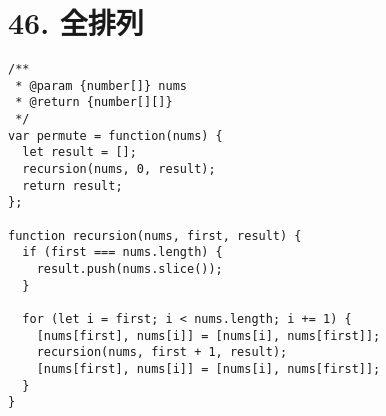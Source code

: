\newpage
\section{46. 全排列}
\label{leetcode:46}

\begin{verbatim}
/**
 * @param {number[]} nums
 * @return {number[][]}
 */
var permute = function(nums) {
  let result = [];
  recursion(nums, 0, result);
  return result;
};

function recursion(nums, first, result) {
  if (first === nums.length) {
    result.push(nums.slice());
  }

  for (let i = first; i < nums.length; i += 1) {
    [nums[first], nums[i]] = [nums[i], nums[first]];
    recursion(nums, first + 1, result);
    [nums[first], nums[i]] = [nums[i], nums[first]];
  }
}
\end{verbatim}